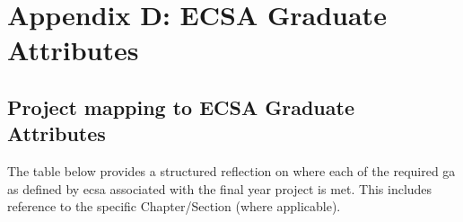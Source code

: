 
\chapter*{Appendix D: ECSA Graduate Attributes}

\section*{Project mapping to ECSA Graduate Attributes}

The table below provides a structured reflection on where each of the required \gls{ga} as defined by \gls{ecsa} associated with the final year project is met. This includes reference to the specific Chapter/Section (where applicable).

\vspace{1em}


